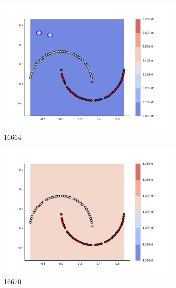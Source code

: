 \begin{figure}[h]
\begin{subfigure}[b]{0.09\textwidth}
    \includegraphics[clip, trim=2.35cm 1.75cm 4.5cm 0cm,width=\textwidth]{img/convergence/16664.pdf}
    \caption{16664}
    \label{fig:convergence_16664}
\end{subfigure}
%
\begin{subfigure}[b]{0.09\textwidth}
    \includegraphics[clip, trim=2.35cm 1.75cm 4.5cm 0cm,width=\textwidth]{img/convergence/16670.pdf}
    \caption{16670}
    \label{fig:convergence_16670}
\end{subfigure}
%
\begin{subfigure}[b]{0.09\textwidth}

\end{subfigure}
\end{figure}
